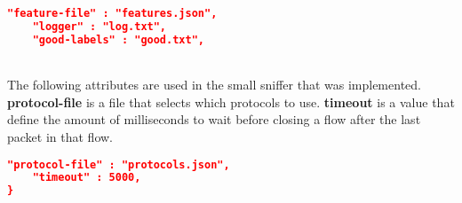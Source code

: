 \begin{lstlisting}[language=json,firstnumber=1]
    "feature-file" : "features.json",
    "logger" : "log.txt",
    "good-labels" : "good.txt",
\end{lstlisting}~\\
\noindent The following attributes are used in the small sniffer that was implemented. \textbf{protocol-file} is a file that selects which protocols to use.  \textbf{timeout} is a value that define the amount of milliseconds to wait before closing a flow after the last packet in that flow.

\begin{lstlisting}[language=json,firstnumber=1]
    "protocol-file" : "protocols.json",
    "timeout" : 5000,
}
\end{lstlisting}
